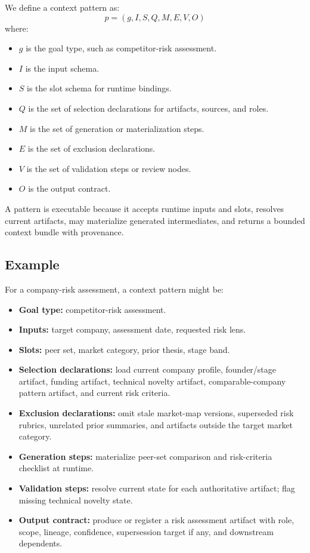 \documentclass{article}
\begin{document}
We define a context pattern as:
\begin{equation}
p = (g, I, S, Q, M, E, V, O)
\end{equation}
where:
\begin{itemize}[leftmargin=*]
\item $g$ is the goal type, such as competitor-risk assessment.
\item $I$ is the input schema.
\item $S$ is the slot schema for runtime bindings.
\item $Q$ is the set of selection declarations for artifacts, sources, and roles.
\item $M$ is the set of generation or materialization steps.
\item $E$ is the set of exclusion declarations.
\item $V$ is the set of validation steps or review nodes.
\item $O$ is the output contract.
\end{itemize}

A pattern is executable because it accepts runtime inputs and slots, resolves current artifacts, may materialize generated intermediates, and returns a bounded context bundle with provenance.

\subsection{Example}

For a company-risk assessment, a context pattern might be:
\begin{itemize}[leftmargin=*]
\item \textbf{Goal type:} competitor-risk assessment.
\item \textbf{Inputs:} target company, assessment date, requested risk lens.
\item \textbf{Slots:} peer set, market category, prior thesis, stage band.
\item \textbf{Selection declarations:} load current company profile, founder/stage artifact, funding artifact, technical novelty artifact, comparable-company pattern artifact, and current risk criteria.
\item \textbf{Exclusion declarations:} omit stale market-map versions, superseded risk rubrics, unrelated prior summaries, and artifacts outside the target market category.
\item \textbf{Generation steps:} materialize peer-set comparison and risk-criteria checklist at runtime.
\item \textbf{Validation steps:} resolve current state for each authoritative artifact; flag missing technical novelty state.
\item \textbf{Output contract:} produce or register a risk assessment artifact with role, scope, lineage, confidence, supersession target if any, and downstream dependents.
\end{itemize}
\end{document}
